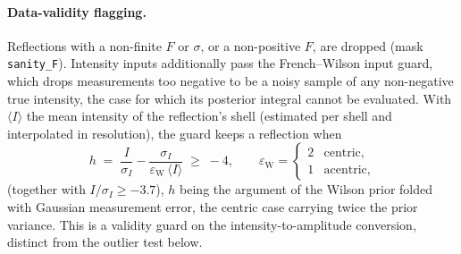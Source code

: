 \documentclass{iucrjournals}
\begin{document}
\paragraph{Data-validity flagging.}
Reflections with a non-finite $F$ or $\sigma$, or a non-positive $F$, are dropped
(mask \texttt{sanity\_F}). Intensity inputs additionally pass the French--Wilson
input guard, which drops measurements too negative to be a noisy sample of any
non-negative true intensity, the case for which its posterior integral cannot be evaluated.
With $\langle I\rangle$ the mean intensity of the reflection's shell (estimated per
shell and interpolated in resolution), the guard keeps a reflection when
%
\begin{equation}
  h \;=\; \frac{I}{\sigma_{I}}
  - \frac{\sigma_{I}}{\varepsilon_\mathrm{W}\,\langle I\rangle}
  \;\ge\; -4,
  \qquad
  \varepsilon_\mathrm{W} =
  \begin{cases} 2 & \text{centric,}\\ 1 & \text{acentric,}\end{cases}
  \label{eq:fw-h}
\end{equation}
%
(together with $I/\sigma_{I} \ge -3.7$), $h$ being the argument of the Wilson prior
folded with Gaussian measurement error, the centric case carrying twice the prior
variance. This is a validity guard on the intensity-to-amplitude conversion,
distinct from the outlier test below.
\end{document}
